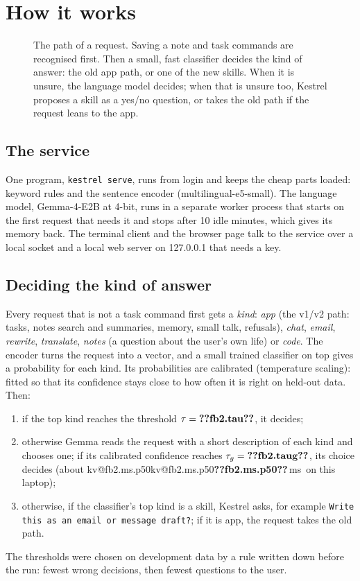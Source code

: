 \documentclass[11pt,a4paper]{article}
\makeatletter
\DeclareRobustCommand{\kv}[1]{\ifcsname kv@#1\endcsname\csname kv@#1\endcsname\else\textbf{??#1??}\fi}
\newcommand{\ms}{\,ms}
\newcommand{\ans}[1]{\texttt{\small #1}}
\makeatother
\begin{document}
\section{How it works}\label{sec:how}

\begin{figure}[t]
\centering

\caption{The path of a request. Saving a note and task commands are recognised first. Then a small, fast classifier
decides the kind of answer: the old app path, or one of the new skills. When it is unsure, the language model decides;
when that is unsure too, Kestrel proposes a skill as a yes/no question, or takes the old path if the request leans to
the app.}
\label{fig:arch}
\end{figure}

\subsection{The service}
One program, \texttt{kestrel serve}, runs from login and keeps the cheap parts loaded: keyword rules and the sentence
encoder (multilingual-e5-small). The language model, Gemma-4-E2B at 4-bit, runs in a separate worker process that starts
on the first request that needs it and stops after 10 idle minutes, which gives its memory back. The terminal client and
the browser page talk to the service over a local socket and a local web server on 127.0.0.1 that needs a key.

\subsection{Deciding the kind of answer}
Every request that is not a task command first gets a \emph{kind}: \emph{app} (the v1/v2 path: tasks, notes search and
summaries, memory, small talk, refusals), \emph{chat}, \emph{email}, \emph{rewrite}, \emph{translate}, \emph{notes} (a
question about the user's own life) or \emph{code}. The encoder turns the request into a vector, and a small trained
classifier on top gives a probability for each kind. Its probabilities are calibrated (temperature scaling): fitted so
that its confidence stays close to how often it is right on held-out data. Then:
\begin{enumerate}
  \item if the top kind reaches the threshold $\tau=\kv{fb2.tau}$, it decides;
  \item otherwise Gemma reads the request with a short description of each kind and chooses one; if its calibrated
  confidence reaches $\tau_g=\kv{fb2.taug}$, its choice decides (about \kv{fb2.ms.p50}\ms\ on this laptop);
  \item otherwise, if the classifier's top kind is a skill, Kestrel asks, for example \ans{Write this as an email or
  message draft?}; if it is app, the request takes the old path.
\end{enumerate}
The thresholds were chosen on development data by a rule written down before the run: fewest wrong decisions, then
fewest questions to the user.
\end{document}
